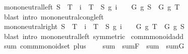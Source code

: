 \begin{isabellebody}
\ mono{\isacharunderscore}{\kern0pt}neutral{\isacharunderscore}{\kern0pt}left{\isacharprime}{\kern0pt}{\isacharcolon}{\kern0pt}\ {\isachardoublequoteopen}S\ {\isasymsubseteq}\ T\ {\isasymLongrightarrow}\ {\isasymforall}i\ {\isasymin}\ T\ {\isacharminus}{\kern0pt}\ S{\isachardot}{\kern0pt}\ g\ i\ {\isacharequal}{\kern0pt}\ \ {\isasymLongrightarrow}\ G\ g\ S\ {\isacharequal}{\kern0pt}\ G\ g\ T{\isachardoublequoteclose}\isanewline
%
\isadelimproof
\ \ %
\endisadelimproof
%
\isatagproof
{}\isamarkupfalse%
\ {\isacharparenleft}{\kern0pt}blast\ intro{\isacharcolon}{\kern0pt}\ mono{\isacharunderscore}{\kern0pt}neutral{\isacharunderscore}{\kern0pt}cong{\isacharunderscore}{\kern0pt}left{\isacharprime}{\kern0pt}{\isacharparenright}{\kern0pt}%
\endisatagproof
{\isafoldproof}%
%
\isadelimproof
\isanewline
%
\endisadelimproof
\isanewline
{}\isamarkupfalse%
\ mono{\isacharunderscore}{\kern0pt}neutral{\isacharunderscore}{\kern0pt}right{\isacharprime}{\kern0pt}{\isacharcolon}{\kern0pt}\ {\isachardoublequoteopen}S\ {\isasymsubseteq}\ T\ {\isasymLongrightarrow}\ {\isasymforall}i\ {\isasymin}\ T\ {\isacharminus}{\kern0pt}\ S{\isachardot}{\kern0pt}\ g\ i\ {\isacharequal}{\kern0pt}\ \ {\isasymLongrightarrow}\ G\ g\ T\ {\isacharequal}{\kern0pt}\ G\ g\ S{\isachardoublequoteclose}\isanewline
%
\isadelimproof
\ \ %
\endisadelimproof
%
\isatagproof
{}\isamarkupfalse%
\ {\isacharparenleft}{\kern0pt}blast\ intro{\isacharbang}{\kern0pt}{\isacharcolon}{\kern0pt}\ mono{\isacharunderscore}{\kern0pt}neutral{\isacharunderscore}{\kern0pt}left{\isacharprime}{\kern0pt}\ {\isacharbrackleft}{\kern0pt}symmetric{\isacharbrackright}{\kern0pt}{\isacharparenright}{\kern0pt}%
\endisatagproof
{\isafoldproof}%
%
\isadelimproof
\isanewline
%
\endisadelimproof
\isanewline
{}\isamarkupfalse%
%
\isadelimdocument
%
\endisadelimdocument
%
\isatagdocument
%
\isamarkuptrue%
%
\endisatagdocument
{\isafolddocument}%
%
\isadelimdocument
%
\endisadelimdocument
{}\isamarkupfalse%
\ comm{\isacharunderscore}{\kern0pt}monoid{\isacharunderscore}{\kern0pt}add\isanewline
{}\isanewline
\isanewline
{}\isamarkupfalse%
\ sum{\isacharcolon}{\kern0pt}\ comm{\isacharunderscore}{\kern0pt}monoid{\isacharunderscore}{\kern0pt}set\ plus\ {}\isanewline
\ \ \ sum\ {\isacharequal}{\kern0pt}\ sum{\isachardot}{\kern0pt}F\ \ sum{\isacharprime}{\kern0pt}\ {\isacharequal}{\kern0pt}\ sum{\isachardot}{\kern0pt}G%

\end{isabellebody}
